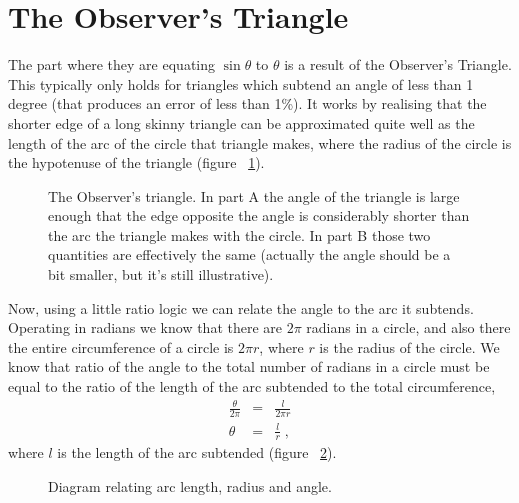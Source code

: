 \documentclass[12pt]{scrartcl}
\begin{document}
\maketitle

\section{The Observer's Triangle}

The part where they are equating $\sin \theta$ to $\theta$ is a result of the
Observer's Triangle. This typically only holds for triangles which subtend an angle of
less than 1 degree (that produces an error of less than 1\%). It works by realising
that the shorter edge of a long skinny triangle can be approximated
quite well as the length of the arc of the circle that triangle makes, where the
radius of the circle is the hypotenuse of the triangle (figure ~\ref{fig:observer}).
\begin{figure}[h]
\centering
\caption{The Observer's triangle. In part A the angle of the triangle is large enough
that the edge opposite the angle is considerably shorter than the arc the triangle
makes with the circle. In part B those two quantities are effectively the same (actually
the angle should be a bit smaller, but it's still illustrative).}
\label{fig:observer}
\end{figure}
Now, using a little ratio logic we can relate the angle to the arc it subtends. Operating
in radians we know that there are $2\pi$ radians in a circle, and also there the
entire circumference of a circle is $2\pi r$, where $r$ is the radius of the circle. We
know that ratio of the angle to the total number of radians in a circle must be equal
to the ratio of the length of the arc subtended to the total circumference,
\begin{eqnarray*}
\frac{\theta}{2\pi} &=& \frac{l}{2\pi r} \\
\theta &=& \frac{l}{r} \; ,
\end{eqnarray*}
where $l$ is the length of the arc subtended (figure ~\ref{fig:ratio}).
\begin{figure}[h]
\centering
{}
\caption{Diagram relating arc length, radius and angle.}
\label{fig:ratio}
\end{figure}
\end{document}
